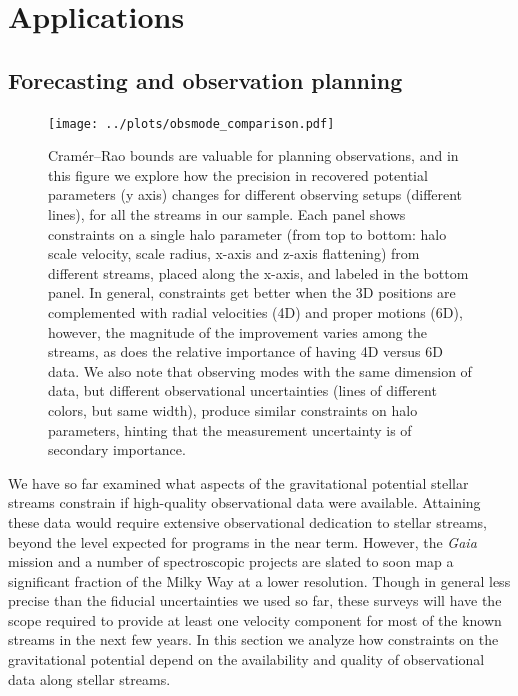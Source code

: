 \documentclass[modern]{aastex61}
\begin{document}

\section{Applications}

\subsection{Forecasting and observation planning}
\label{sec:forecast}
\begin{figure}
\begin{center}
\texttt{[image: ../plots/obsmode\_comparison.pdf]}
\caption{Cram\'er--Rao bounds are valuable for planning observations, and in this figure we explore how the precision in recovered potential parameters (y axis) changes for different observing setups (different lines), for all the streams in our sample.
Each panel shows constraints on a single halo parameter (from top to bottom: halo scale velocity, scale radius, x-axis and z-axis flattening) from different streams, placed along the x-axis, and labeled in the bottom panel.
In general, constraints get better when the 3D positions are complemented with radial velocities (4D) and proper motions (6D), however, the magnitude of the improvement varies among the streams, as does the relative importance of having 4D versus 6D data.
We also note that observing modes with the same dimension of data, but different observational uncertainties (lines of different colors, but same width), produce similar constraints on halo parameters, hinting that the measurement uncertainty is of secondary importance. 
}
\label{fig:obsmodes}
\end{center}
\end{figure}

We have so far examined what aspects of the gravitational potential stellar streams constrain if high-quality observational data were available.
Attaining these data would require extensive observational dedication to stellar streams, beyond the level expected for programs in the near term.
However, the \emph{Gaia} mission and a number of spectroscopic projects are slated to soon map a significant fraction of the Milky Way at a lower resolution.
Though in general less precise than the fiducial uncertainties we used so far, these surveys will have the scope required to provide at least one velocity component for most of the known streams in the next few years.
In this section we analyze how constraints on the gravitational potential depend on the availability and quality of observational data along stellar streams. 
\end{document}
